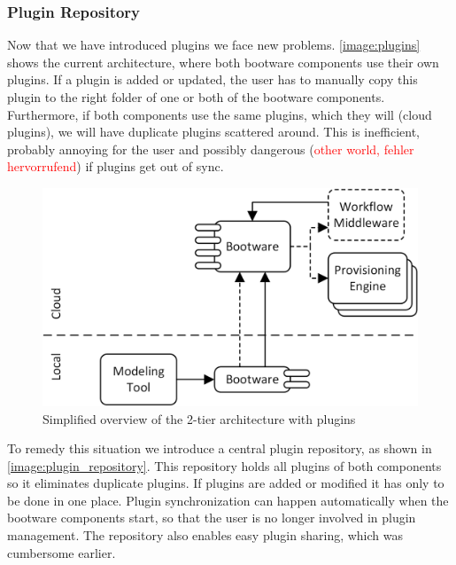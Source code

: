 \subsubsection{Plugin Repository}

Now that we have introduced plugins we face new problems.
\autoref{image:plugins} shows the current architecture, where both bootware components use their own plugins.
If a plugin is added or updated, the user has to manually copy this plugin to the right folder of one or both of the bootware components.
Furthermore, if both components use the same plugins, which they will (cloud plugins), we will have duplicate plugins scattered around.
This is inefficient, probably annoying for the user and possibly dangerous (\textcolor{red}{other world, fehler hervorrufend}) if plugins get out of sync.

\begin{figure}[!htbp]
	\centering
	\includegraphics[resolution=600]{design/assets/simple_plugins}
	\caption{Simplified overview of the 2-tier architecture with plugins}
	\label{image:plugins}
\end{figure}

To remedy this situation we introduce a central plugin repository, as shown in \autoref{image:plugin_repository}.
This repository holds all plugins of both components so it eliminates duplicate plugins.
If plugins are added or modified it has only to be done in one place.
Plugin synchronization can happen automatically when the bootware components start, so that the user is no longer involved in plugin management.
The repository also enables easy plugin sharing, which was cumbersome earlier.

